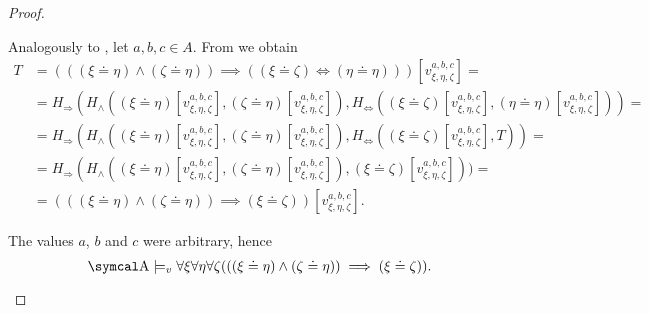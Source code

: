 \begin{proof}
\begin{description}
     Analogously to , let \( a, b, c \in A \). From  we obtain
    \begin{align*}
      T &=
      (((\xi \doteq \eta) \land (\zeta \doteq \eta)) \implies ((\xi \doteq \zeta) \iff (\eta \doteq \eta)))[v_{\xi,\eta,\zeta}^{a,b,c}]
      = \\ &=
      H_\Rightarrow(H_\land((\xi \doteq \eta)[v_{\xi,\eta,\zeta}^{a,b,c}], (\zeta \doteq \eta)[v_{\xi,\eta,\zeta}^{a,b,c}]), H_\Leftrightarrow((\xi \doteq \zeta)[v_{\xi,\eta,\zeta}^{a,b,c}], (\eta \doteq \eta)[v_{\xi,\eta,\zeta}^{a,b,c}]))
      = \\ &=
      H_\Rightarrow(H_\land((\xi \doteq \eta)[v_{\xi,\eta,\zeta}^{a,b,c}], (\zeta \doteq \eta)[v_{\xi,\eta,\zeta}^{a,b,c}]), H_\Leftrightarrow((\xi \doteq \zeta)[v_{\xi,\eta,\zeta}^{a,b,c}], T))
      = \\ &=
      H_\Rightarrow(H_\land((\xi \doteq \eta)[v_{\xi,\eta,\zeta}^{a,b,c}], (\zeta \doteq \eta)[v_{\xi,\eta,\zeta}^{a,b,c}]), (\xi \doteq \zeta)[v_{\xi,\eta,\zeta}^{a,b,c}]))
      = \\ &=
      (((\xi \doteq \eta) \land (\zeta \doteq \eta)) \implies (\xi \doteq \zeta))[v_{\xi,\eta,\zeta}^{a,b,c}].
    \end{align*}

    The values \( a \), \( b \) and \( c \) were arbitrary, hence
    \begin{equation*}
      \CA \models_v \forall \xi \forall \eta \forall \zeta (((\xi \doteq \eta) \land (\zeta \doteq \eta)) \implies (\xi \doteq \zeta)).
    \end{equation*}
  \end{description}
\end{proof}

